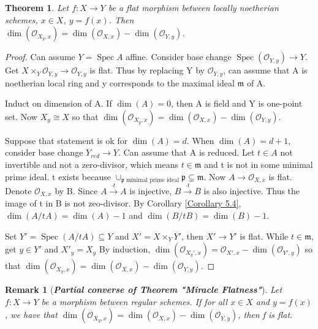 \documentclass{ctexart}
\newtheorem{remark}{Remark}[section]
\newtheorem{theorem}{Theorem}[section]
\newcommand{\spec}{\operatorname{Spec}}
\begin{document}
\begin{theorem}
    Let $f: X \longrightarrow Y$ be a flat morphism between locally noetherian schemes, $x\in X$, $y = f(x)$.
    Then $\dim(\mathcal{O}_{X_{y}, x}) = \dim(\mathcal{O}_{X, x}) - \dim(\mathcal{O}_{Y, y})$.
    \label{Theorem 5.8}
\end{theorem}
\begin{proof}
    Can assume $Y = \spec A$ affine.
    Consider base change $\spec(\mathcal{O}_{Y, y}) \longrightarrow Y$.
    Get $X \times_{Y} \mathcal{O}_{Y, y} \longrightarrow \mathcal{O}_{Y, y}$ is flat.
    Thus by replacing Y by $\mathcal{O}_{Y, y}$, can assume that A is noetherian local ring and y corresponds to the maximal ideal $\mathfrak{m}$ of A.
    \par
    Induct on dimension of A.
    If $\dim(A) = 0$, then A is field and Y is one-point set.
    Now $X_{y} \cong X$ so that $\dim(\mathcal{O}_{X_{y}, x}) = \dim(\mathcal{O}_{X, x}) - \dim(\mathcal{O}_{Y, y})$.
    \par
    Suppose that statement is ok for $\dim(A) = d$.
    When $\dim(A) = d + 1$, consider base change $Y_{red} \longrightarrow Y$.
    Can assume that A is reduced.
    Let $t\in A$ not invertible and not a zero-divisor, which means $t\in \mathfrak{m}$ and t is not in some minimal prime ideal. 
    t exists because $\cup_{\mathfrak{p} \text{ minimal prime ideal}} \mathfrak{p} \subsetneq \mathfrak{m}$.
    Now $A \longrightarrow \mathcal{O}_{X, x}$ is flat.
    Denote $\mathcal{O}_{X, x}$ by B.
    Since $A \overset{\cdot t}{\longrightarrow} A$ is injective, $B \overset{\cdot t}{\longrightarrow} B$ is also injective.
    Thus the image of t in B is not zeo-divisor.
    By Corollary \ref{Corollary 5.4}, $\dim(A/tA) = \dim(A) - 1$ and $\dim(B/tB) = \dim(B) - 1$.
    \par
    Set $Y' = \spec(A/tA) \subseteq Y$ and $X' = X \times_{Y} Y'$, then $X' \longrightarrow Y'$ is flat.
    While $t\in \mathfrak{m}$, get $y\in Y'$ and $X'_{y} = X_{y}$
    By induction, $\dim(\mathcal{O}_{X_{y}', x}) = \mathcal{O}_{X', x} - \dim(\mathcal{O}_{Y', y})$ so that $\dim(\mathcal{O}_{X_{y}, x}) = \dim(\mathcal{O}_{X, x}) - \dim(\mathcal{O}_{Y, y})$.
\end{proof}
\begin{remark}[\textbf{\emph{Partial converse of Theorem "Miracle Flatness"}}]
    Let $f: X \longrightarrow Y$ be a morphism between regular schemes.
    If for all $x\in X$ and $y = f(x)$, we have that $\dim(\mathcal{O}_{X_{y}, x}) = \dim(\mathcal{O}_{X, x}) - \dim(\mathcal{O}_{Y, y})$, then f is flat.
\end{remark}
\end{document}
